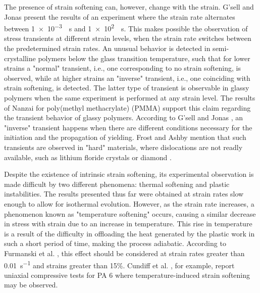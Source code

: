 The presence of strain softening can, however, change with the strain.
G'sell and Jonas \citep{gsellYieldTransientEffects1981} present the results of an experiment where the strain rate alternates between \SI{1e-3}{\per\second} and \SI{1e2}{\per \second}.
This makes possible the observation of stress transients at different strain levels, when the strain rate switches between the predetermined strain rates.
An unusual behavior is detected in semi-crystalline polymers below the glass transition temperature, such that for lower strains a "normal" transient, i.e., one corresponding to no strain softening, is observed, while at higher strains an "inverse" transient, i.e., one coinciding with strain softening, is detected.
The latter type of transient is observable in glassy polymers when the same experiment is performed at any strain level.
The results of Nanzai \citep{nanzaiTransitionMechanismElastic1990} for poly(methyl methacrylate) (PMMA) support this claim regarding the transient behavior of glassy polymers.
According to G'sell and Jonas \citep{gsellDeterminationPlasticBehaviour1979}, an "inverse" transient happens when there are different conditions necessary for the initiation and the propagation of yielding.
Frost and Ashby \citep{frostDeformationmechanismMapsPlasticity1982} mention that such transients are observed in "hard" materials, where dislocations are not readly available, such as lithium floride crystals \citep{gilmanDislocationSourcesCrystals1959, johnstonYieldPointsDelay1962} or diamond \citep{alexanderDislocationsPlasticFlow1969}.

Despite the existence of intrinsic strain softening, its experimental observation is made difficult by two different phenomena: thermal softening and plastic instabilities.
The results presented thus far were obtained at strain rates slow enough to allow for isothermal evolution.
However, as the strain rate increases, a phenomenon known as "temperature softening" occurs, causing a similar decrease in stress with strain due to an increase in temperature.
This rise in temperature is a result of the difficulty in offloading the heat generated by the plastic work in such a short period of time, making the process adiabatic.
According to Furmanski et al. \citep{furmanskiTimeTemperatureEquivalence2013}, this effect should be considered at strain rates greater than \SI{0.01}{s^{-1}} and strains greater than 15\%.
Cundiff et al. \citep{cundiffModelingViscoplasticBehavior2022}, for example, report uniaxial compressive tests for PA 6 where temperature-induced strain softening may be observed.

